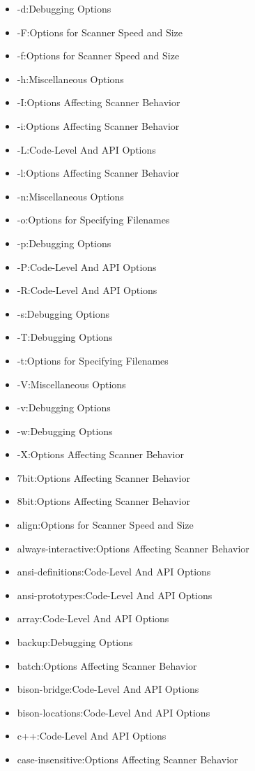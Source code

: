 \documentclass[openany,oneside]{book}
\begin{document}
\begin{itemize}
\item -d:Debugging Options
\item -F:Options for Scanner Speed and Size
\item -f:Options for Scanner Speed and Size
\item -h:Miscellaneous Options
\item -I:Options Affecting Scanner Behavior
\item -i:Options Affecting Scanner Behavior
\item -L:Code-Level And API Options
\item -l:Options Affecting Scanner Behavior
\item -n:Miscellaneous Options
\item -o:Options for Specifying Filenames
\item -p:Debugging Options
\item -P:Code-Level And API Options
\item -R:Code-Level And API Options
\item -s:Debugging Options
\item -T:Debugging Options
\item -t:Options for Specifying Filenames
\item -V:Miscellaneous Options
\item -v:Debugging Options
\item -w:Debugging Options
\item -X:Options Affecting Scanner Behavior
\item 7bit:Options Affecting Scanner Behavior
\item 8bit:Options Affecting Scanner Behavior
\item align:Options for Scanner Speed and Size
\item always-interactive:Options Affecting Scanner Behavior
\item ansi-definitions:Code-Level And API Options
\item ansi-prototypes:Code-Level And API Options
\item array:Code-Level And API Options
\item backup:Debugging Options
\item batch:Options Affecting Scanner Behavior
\item bison-bridge:Code-Level And API Options
\item bison-locations:Code-Level And API Options
\item c++:Code-Level And API Options
\item case-insensitive:Options Affecting Scanner Behavior

\end{itemize}
\end{document}
